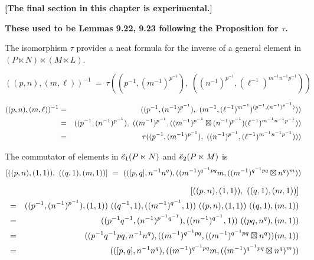 
\newpage
\noindent
{\bf [The final section in this chapter is experimental.]}

\bigskip
\noindent
{\bf These used to be Lemmas 9.22, 9.23 following the Proposition for $\tau$.} 

\bigskip
The isomorphism $\tau$ provides a neat formula for the inverse of a 
general element in $(P \ltimes N) \ltimes (M \ltimes L)$.
\begin{lem}
$$
((p,n),(m,\ell))^{-1} ~=~ 
\tau((p^{-1},(m^{-1})^{p^{-1}}),~ 
 ((n^{-1})^{p^{-1}},(\ell^{-1})^{m^{-1}n^{-1}p^{-1}}))
$$
\end{lem}
\begin{pf}
\begin{eqnarray*}
((p,n),(m,\ell))^{-1} 
 &=& ((p^{-1},(n^{-1})^{p^{-1}}),~
        (m^{-1},(\ell^{-1})^{m^{-1}})^{(p^{-1},(n^{-1})^{p^{-1}})})) \\
 &=& ((p^{-1},(n^{-1})^{p^{-1}}),~
        ((m^{-1})^{p^{-1}},
          ((m^{-1})^{p^{-1}} \boxtimes (n^{-1})^{p^{-1}}) 
           (\ell^{-1})^{m^{-1}n^{-1}p^{-1}})) \\
 &=& \tau((p^{-1},(m^{-1})^{p^{-1}}),~ 
          ((n^{-1})^{p^{-1}},(\ell^{-1})^{m^{-1}n^{-1}p^{-1}}))) 
\end{eqnarray*}
\end{pf}

\begin{lem}
The commutator of elements in $\ddot{e}_1(P \ltimes N)$ 
and $\ddot{e}_2(P \ltimes M)$ is 
$$
 [((p,n),(1,1)),~((q,1),(m,1))]
~=~
 (([p,q],n^{-1}n^q), 
      ((m^{-1})^{q^{-1}pq}m,((m^{-1})^{q^{-1}pq}\boxtimes n^q)^m))
$$
\end{lem}
\begin{pf}
\vspace*{-8mm}
\begin{eqnarray*}
 & & [((p,n),(1,1)),~((q,1),(m,1))] \\
 &=& ((p^{-1},(n^{-1})^{p^{-1}}),(1,1))~
     ((q^{-1},1),((m^{-1})^{q^{-1}},1))~ 
     ((p,n),(1,1))~
     ((q,1),(m,1)) \\
 &=& ((p^{-1}q^{-1},(n^{-1})^{p^{-1}q^{-1}}),((m^{-1})^{q^{-1}},1))~ 
     ((pq,n^q),(m,1)) \\
 &=& ((p^{-1}q^{-1}pq,n^{-1}n^q), 
      ((m^{-1})^{q^{-1}pq},((m^{-1})^{q^{-1}pq}\boxtimes n^q))(m,1)) \\
 &=& (([p,q],n^{-1}n^q), 
      ((m^{-1})^{q^{-1}pq}m,((m^{-1})^{q^{-1}pq}\boxtimes n^q)^m)) 
\end{eqnarray*}
\end{pf}



